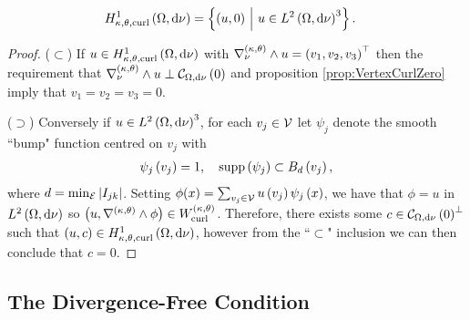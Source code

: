 \begin{cory} \label{cory:VertexCurlSob}
	\begin{align*}
		H^1_{\kappa,\theta,\mathrm{curl}}\left( \Omega, \mathrm{d}\nu \right) &= \left\{  \left( u,0 \right) \ \middle\vert \  u\in L^{2}\left( \Omega,\mathrm{d}\nu \right)^3  \right\}.
	\end{align*}
\end{cory}
\begin{proof}
	($\subset$) If $u\in H^1_{\kappa,\theta,\mathrm{curl}}\left( \Omega, \mathrm{d}\nu \right)$ with $\nabla_{\nu}^{\left( \kappa, \theta \right)}\wedge u=\left( v_1,v_2,v_3 \right)^\top$ then the requirement that $\nabla_{\nu}^{\left( \kappa, \theta \right)}\wedge u \perp \mathcal{C}_{ \Omega, \mathrm{d}\nu}\left( 0 \right)$ and proposition \ref{prop:VertexCurlZero} imply that $v_1=v_2=v_3=0$.
	
	($\supset$) Conversely if $u\in L^{2}\left( \Omega,\mathrm{d}\nu \right)^3$, for each $v_j\in\mathcal{V}$ let $\psi_j$ denote the smooth ``bump" function centred on $v_j$ with
	\begin{align*}
		\psi_j\left( v_j \right) = 1, \quad
		\mathrm{supp}\left( \psi_j \right) \subset B_d\left( v_j \right),
	\end{align*}
	where $d=\min_{\mathcal{E}}\left\lvert I_{jk} \right\rvert$.
	Setting $\phi(x) = \sum_{v_j\in\mathcal{V}}u\left( v_j \right)\psi_j\left( x \right)$, we have that $\phi=u$ in $L^{2}\left( \Omega,\mathrm{d}\nu \right)$ so $\left( u,\nabla_{}^{\left( \kappa, \theta \right)}\wedge\phi \right)\in W^{\left( \kappa, \theta \right)}_{\mathrm{curl}}$.
	Therefore, there exists some $c\in\mathcal{C}_{ \Omega, \mathrm{d}\nu}\left( 0 \right)^{\perp}$ such that $\left( u,c \right)\in H^1_{\kappa,\theta,\mathrm{curl}}\left( \Omega, \mathrm{d}\nu \right)$, however from the ``$\subset$" inclusion we can then conclude that $c = 0$.
\end{proof}

\subsection{The Divergence-Free Condition} \label{apps:DivFreeVertex}

